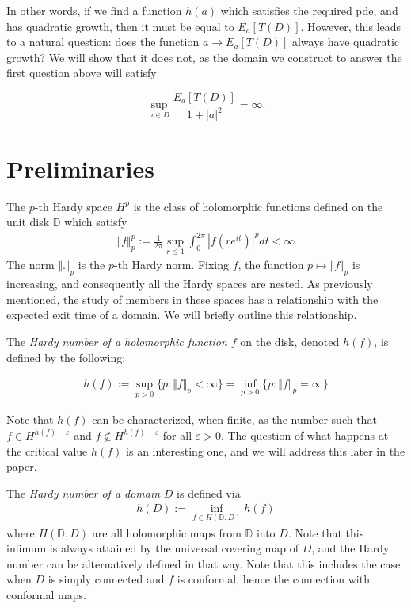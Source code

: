 \documentclass[a4paper, oneside, 12pt]{amsart}
\newcommand{\DD}{\mathbb{D}}
\newcommand{\eps}{\varepsilon}
\begin{document}
In other words, if we find a function $h(a)$ which satisfies the required pde, and has quadratic growth, then it must be equal to $E_a[T(D)]$. However, this leads to a natural question: does the function $a \to E_a[T(D)]$ always have quadratic growth? We will show that it does not, as the domain we construct to answer the first question above will satisfy

$$
\sup_{a \in D}\frac{E_a[T(D)]}{1+|a|^2} = \infty.
$$

\section{Preliminaries}
The $p$-th Hardy space $H^p$ is the class of holomorphic functions defined on the unit disk $\DD$ which satisfy  
\begin{align*}
    \Vert f\Vert_p^p := \frac{1}{2\pi}\sup_{r\leq 1} \int_0^{2\pi} |f(re^{it})|^p dt < \infty
\end{align*}
The norm $\Vert . \Vert_p$ is the $p$-th Hardy norm. Fixing $f$, the function $p\mapsto\Vert f\Vert_p$ is 
increasing, and consequently all the Hardy spaces are nested. As previously mentioned, the study of members in
these spaces has a relationship with the expected exit time of a domain. We
will briefly outline this relationship.

The \textit{Hardy number of a holomorphic function $f$} on the disk, denoted $h(f)$,
is defined by the following:

\begin{align*}
    h(f) := \sup_{p>0} \{p: \Vert f\Vert_p <\infty\} = \inf_{p>0} \{p: \Vert f\Vert_p =\infty\}
\end{align*}

Note that $h(f)$ can be characterized, when finite, as the number such that $f\in H^{h(f)-\eps}$ and $f\notin H^{h(f)+\eps}$ for 
all $\eps>0$. The question of what happens at the critical value $h(f)$ is an interesting one, and we will address this later in the paper. %

The {\it Hardy number of a domain} $D$ is defined via
    \begin{align*}
        h(D) := \inf_{f\in H(\DD, D)} h(f)
    \end{align*}
    where $H(\DD, D)$ are all holomorphic maps from $\DD$ into $D$. Note that this infimum is always attained by the universal covering map of $D$, and the Hardy number can be alternatively defined in that way. Note that this includes the case when $D$ is simply connected and $f$ is conformal, hence the connection with conformal maps.\\
\end{document}
